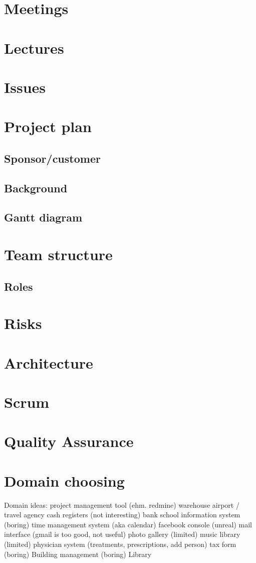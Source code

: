 \section{Meetings}
\section{Lectures}
\section{Issues}


\section{Project plan}
\subsection{Sponsor/customer}
\subsection{Background}
\subsection{Gantt diagram}
\section{Team structure}
\subsection{Roles}
 
\section{Risks}
\section{Architecture}
\section{Scrum}
\section{Quality Assurance}

\section{Domain choosing}
Domain ideas:
project management tool (ehm. redmine)
warehouse
airport / travel agency
cash registers (not interesting)
bank
school information system (boring)
time management system (aka calendar)
facebook console (unreal)
mail interface (gmail is too good, not useful)
photo gallery (limited)
music library (limited)
physician system (treatments, prescriptions, add person)
tax form (boring)
Building management (boring)
Library

